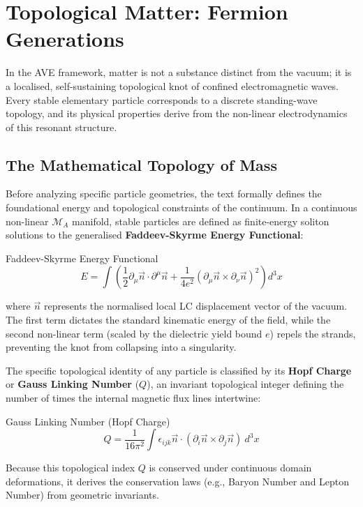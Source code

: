 \chapter{Topological Matter: Fermion Generations}
\label{ch:topological_matter}

In the AVE framework, matter is not a substance distinct from the vacuum; it is a localised, self-sustaining topological knot of confined electromagnetic waves. Every stable elementary particle corresponds to a discrete standing-wave topology, and its physical properties derive from the non-linear electrodynamics of this resonant structure.

\section{The Mathematical Topology of Mass}
Before analyzing specific particle geometries, the text formally defines the foundational energy and topological constraints of the continuum. In a continuous non-linear $\mathcal{M}_A$ manifold, stable particles are defined as finite-energy soliton solutions to the generalised \textbf{Faddeev-Skyrme Energy Functional}:
\begin{resultbox}{Faddeev-Skyrme Energy Functional}
\begin{equation}
    E = \int \left( \frac{1}{2}\partial_\mu \vec{n} \cdot \partial^\mu \vec{n} + \frac{1}{4e^2}(\partial_\mu \vec{n} \times \partial_\nu \vec{n})^2 \right) d^3x
\end{equation}
\end{resultbox}
where $\vec{n}$ represents the normalised local LC displacement vector of the vacuum. The first term dictates the standard kinematic energy of the field, while the second non-linear term (scaled by the dielectric yield bound $e$) repels the strands, preventing the knot from collapsing into a singularity.

The specific topological identity of any particle is classified by its \textbf{Hopf Charge} or \textbf{Gauss Linking Number} ($Q$), an invariant topological integer defining the number of times the internal magnetic flux lines intertwine:
\begin{resultbox}{Gauss Linking Number (Hopf Charge)}
\begin{equation}
    Q = \frac{1}{16\pi^2} \int \epsilon_{ijk} \vec{n} \cdot (\partial_i \vec{n} \times \partial_j \vec{n}) \ d^3x
\end{equation}
\end{resultbox}
Because this topological index $Q$ is conserved under continuous domain deformations, it derives the conservation laws (e.g., Baryon Number and Lepton Number) from geometric invariants.

